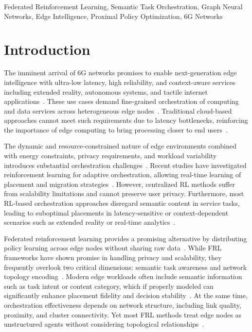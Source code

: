 \documentclass[conference]{IEEEtran}
\begin{document}
	
	\begin{IEEEkeywords}
		Federated Reinforcement Learning, Semantic Task Orchestration, Graph Neural Networks, Edge Intelligence, Proximal Policy Optimization, 6G Networks
	\end{IEEEkeywords}
	
	
	\section{Introduction}
	
	The imminent arrival of 6G networks promises to enable next-generation edge intelligence with ultra-low latency, high reliability, and context-aware services including extended reality, autonomous systems, and tactile internet applications~\cite{cui2025}. These use cases demand fine-grained orchestration of computing and data services across heterogeneous edge nodes~\cite{shi2023}. Traditional cloud-based approaches cannot meet such requirements due to latency bottlenecks, reinforcing the importance of edge computing to bring processing closer to end users~\cite{vahabi2025}.
	
	The dynamic and resource-constrained nature of edge environments combined with energy constraints, privacy requirements, and workload variability introduces substantial orchestration challenges~\cite{yang2023rlcs}. Recent studies have investigated reinforcement learning for adaptive orchestration, allowing real-time learning of placement and migration strategies~\cite{shi2023}. However, centralized RL methods suffer from scalability limitations and cannot preserve user privacy. Furthermore, most RL-based orchestration approaches disregard semantic content in service tasks, leading to suboptimal placements in latency-sensitive or context-dependent scenarios such as extended reality or real-time analytics~\cite{zhang2025semantic}.
	
	Federated reinforcement learning provides a promising alternative by distributing policy learning across edge nodes without sharing raw data~\cite{wu2024topology}. While FRL frameworks have shown promise in handling privacy and scalability, they frequently overlook two critical dimensions: semantic task awareness and network topology encoding~\cite{ogenyi2025comprehensive, zhang2024optimizing}. Modern edge workloads often include semantic information such as task intent or content category, which if properly modeled can significantly enhance placement fidelity and decision stability~\cite{zhang2025semantic}. At the same time, orchestration effectiveness depends on network structure, including link quality, proximity, and cluster connectivity. Yet most FRL methods treat edge nodes as unstructured agents without considering topological relationships~\cite{wu2024topology}.
	
\end{document}
